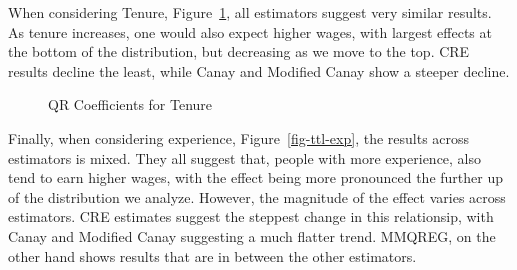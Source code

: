 \documentclass[bib]{statapress}
\begin{document}
When considering Tenure, Figure~\ref{fig-tenure}, all estimators suggest
very similar results. As tenure increases, one would also expect higher
wages, with largest effects at the bottom of the distribution, but
decreasing as we move to the top. CRE results decline the least, while
Canay and Modified Canay show a steeper decline.

\begin{figure}[H]


\caption{\label{fig-tenure}QR Coefficients for Tenure}

\end{figure}%

Finally, when considering experience, Figure~\ref{fig-ttl-exp}, the
results across estimators is mixed. They all suggest that, people with
more experience, also tend to earn higher wages, with the effect being
more pronounced the further up of the distribution we analyze. However,
the magnitude of the effect varies across estimators. CRE estimates
suggest the steppest change in this relationsip, with Canay and Modified
Canay suggesting a much flatter trend. MMQREG, on the other hand shows
results that are in between the other estimators.
\end{document}
